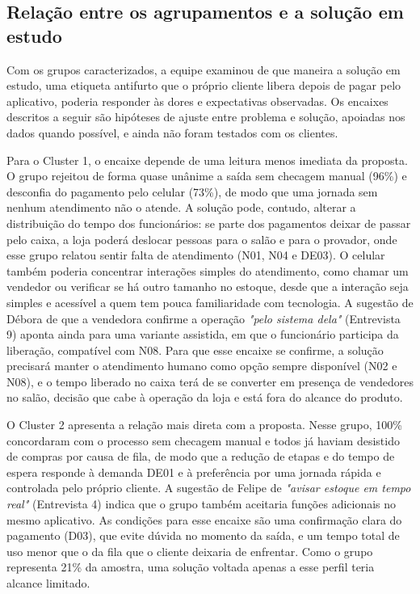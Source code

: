 \subsection{Relação entre os agrupamentos e a solução em estudo}
\label{sec:solucao_clusters}

Com os grupos caracterizados, a equipe examinou de que maneira a solução em estudo, uma etiqueta antifurto que o próprio cliente libera depois de pagar pelo aplicativo, poderia responder às dores e expectativas observadas. Os encaixes descritos a seguir são hipóteses de ajuste entre problema e solução, apoiadas nos dados quando possível, e ainda não foram testados com os clientes.

Para o Cluster 1, o encaixe depende de uma leitura menos imediata da proposta. O grupo rejeitou de forma quase unânime a saída sem checagem manual (96\%) e desconfia do pagamento pelo celular (73\%), de modo que uma jornada sem nenhum atendimento não o atende. A solução pode, contudo, alterar a distribuição do tempo dos funcionários: se parte dos pagamentos deixar de passar pelo caixa, a loja poderá deslocar pessoas para o salão e para o provador, onde esse grupo relatou sentir falta de atendimento (N01, N04 e DE03). O celular também poderia concentrar interações simples do atendimento, como chamar um vendedor ou verificar se há outro tamanho no estoque, desde que a interação seja simples e acessível a quem tem pouca familiaridade com tecnologia. A sugestão de Débora de que a vendedora confirme a operação \emph{"pelo sistema dela"} (Entrevista 9) aponta ainda para uma variante assistida, em que o funcionário participa da liberação, compatível com N08. Para que esse encaixe se confirme, a solução precisará manter o atendimento humano como opção sempre disponível (N02 e N08), e o tempo liberado no caixa terá de se converter em presença de vendedores no salão, decisão que cabe à operação da loja e está fora do alcance do produto.

O Cluster 2 apresenta a relação mais direta com a proposta. Nesse grupo, 100\% concordaram com o processo sem checagem manual e todos já haviam desistido de compras por causa de fila, de modo que a redução de etapas e do tempo de espera responde à demanda DE01 e à preferência por uma jornada rápida e controlada pelo próprio cliente. A sugestão de Felipe de \emph{"avisar estoque em tempo real"} (Entrevista 4) indica que o grupo também aceitaria funções adicionais no mesmo aplicativo. As condições para esse encaixe são uma confirmação clara do pagamento (D03), que evite dúvida no momento da saída, e um tempo total de uso menor que o da fila que o cliente deixaria de enfrentar. Como o grupo representa 21\% da amostra, uma solução voltada apenas a esse perfil teria alcance limitado.

